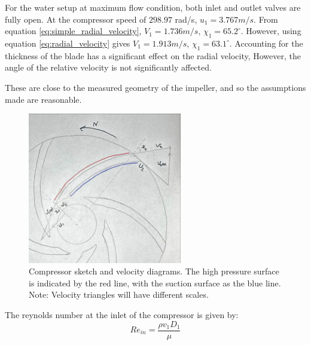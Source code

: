 \documentclass{article}
\begin{document}
For the water setup at maximum flow condition, both inlet and outlet valves are fully open.
At the compressor speed of $298.97$ rad/s, $u_1 = 3.767 m/s$.
From equation \ref{eq:simple_radial_velocity}, $V_1 = 1.736 m/s$, $\chi_1 = 65.2^\circ$.
However, using equation \ref{eq:radial_velocity} gives $V_1 = 1.913 m/s$, $\chi_1 = 63.1^\circ$.
Accounting for the thickness of the blade has a significant effect on the radial velocity,
However, the angle of the relative velocity is not significantly affected.

These are close to the measured geometry of the impeller, and so the assumptions made are reasonable.


\begin{figure}[H]
    \centering
    \includegraphics[width=0.6\textwidth]{velocity_diagrams.jpg}
    \caption{Compressor sketch and velocity diagrams. The high pressure surface is indicated by the red line, with the suction surface as the blue line.
    Note: Velocity triangles will have different scales.}
    \label{fig:vel_diagrams}
\end{figure}



The reynolds number at the inlet of the compressor is given by:
\begin{equation}
    Re_{in} = \frac{\rho v_1 D_1}{\mu}
\end{equation}
\end{document}
